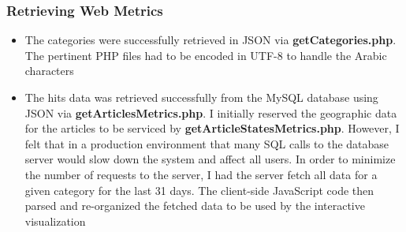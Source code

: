 \documentclass[12pt]{article}
\begin{document}
\subsubsection{Retrieving Web Metrics}
\begin{itemize}
\item The categories were successfully retrieved in JSON via \textbf{getCategories.php}. The pertinent PHP files had to be encoded in UTF-8 to handle the Arabic characters
\item The hits data was retrieved successfully from the MySQL database using JSON via \textbf{getArticlesMetrics.php}. I initially reserved the geographic data for the articles to be serviced by \textbf{getArticleStatesMetrics.php}. However, I felt that in a production environment that many SQL calls to the database server would slow down the system and affect all users. In order to minimize the number of requests to the server, I had the server fetch all data for a given category for the last 31 days. The client-side JavaScript code then parsed and re-organized the fetched data to be used by the interactive visualization
\end{itemize}
\end{document}
